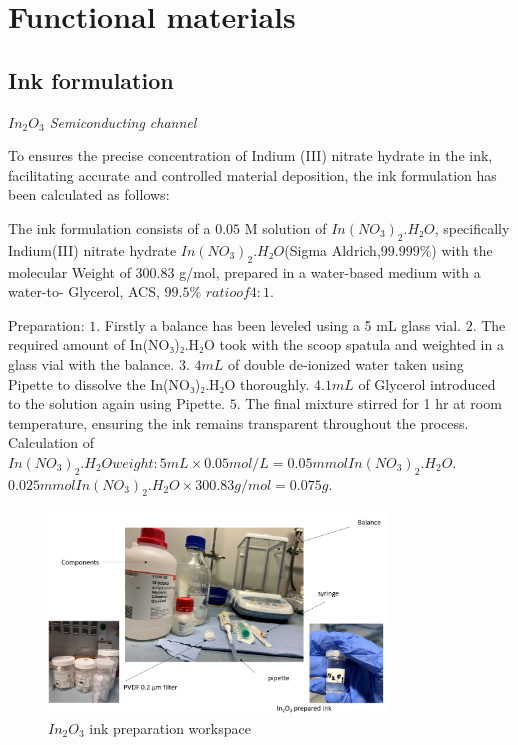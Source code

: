\section{Functional materials}
\subsection{Ink formulation}
\textit{$In_2O_3$ Semiconducting channel }

To ensures the precise concentration of Indium (III) nitrate hydrate in the ink, facilitating accurate and controlled material deposition, the ink formulation has been calculated as follows:

The ink formulation consists of a $0.05$ M solution of  $In(NO_3)_2.H₂O$, specifically Indium(III) nitrate hydrate $In(NO_3)_2.H₂O$(Sigma Aldrich,$ 99.999\%$) with the molecular Weight of 300.83 g/mol, prepared in a water-based medium with a water-to- Glycerol, ACS, $99.5$\% $ratio of 4:1$.

Preparation:
$1.$	Firstly a balance has been leveled using a 5 mL glass vial.
$2.$	The required amount of In(NO₃)₂.H₂O took with the scoop spatula and weighted in a glass vial with the balance.
$3.$	$4 mL$ of  double de-ionized water taken using Pipette to dissolve the In(NO₃)₂.H₂O thoroughly.
$4.$$1 mL$ of Glycerol introduced to the solution again using Pipette.
$5.$	The final mixture stirred for 1 hr at room temperature, ensuring the ink remains transparent throughout the process.
Calculation of $In(NO_3)_2.H_2O weight: 5 mL\times0.05 mol/L=0.05 mmol In(NO_3)_2.H_2O$.
$0.025mmolIn(NO_3)_2.H_2O\times300.83 g/mol=0.075 g.$

\begin{figure}[h!]
\centering
\includegraphics[width=0.8\textwidth]
{figures/inoink.png}
\caption[Example of caption.]{$In_2O_3$ ink preparation workspace\label{lino}}
\end{figure}


